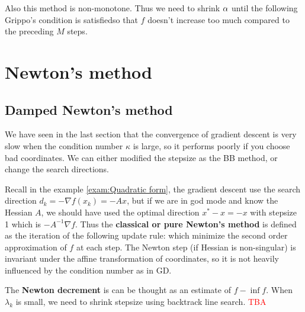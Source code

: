 \documentclass[a4paper]{mynotes}
\def\redd#1{\textcolor{red}{#1}}
\begin{document}
Also this method is non-monotone. Thus we need to shrink $\aa$ until the following Grippo's condition is satisfiedso that $f$ doesn't increase too much compared to the preceding $M$ steps.











\section{Newton's method}
\subsection{Damped Newton's method}
We have seen in the last section that the convergence of gradient descent is very slow when the condition number $\kappa$ is large, so it performs poorly if you choose bad coordinates. We can either modified the stepsize as the BB method, or change the search directions. 

Recall in the example \ref{exam:Quadratic form}, the gradient descent use the search direction $d_k=-\nabla f(x_k)=-Ax$, but if we are in god mode and know the Hessian $A$, we should have used the optimal direction $x^*-x=-x$ with stepsize 1 which is $-A^{-1}\nabla f$. Thus the \textbf{classical or pure Newton's method} is defined as the iteration of the following update rule: which minimize the second order approximation of $f$ at each step. The Newton step (if Hessian is non-singular) is invariant under the affine transformation of coordinates, so it is not heavily influenced by the condition number as in GD.

The \textbf{Newton decrement} is can be thought as an estimate of $f-\inf f$. When $\lambda_k$ is small, we need to shrink stepsize using backtrack line search. \redd{TBA}
\end{document}
